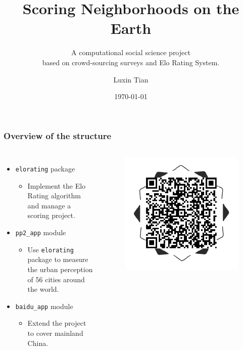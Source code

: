 \documentclass{beamer}
\title{Scoring Neighborhoods on the Earth}
\subtitle{A computational social science project \\based on crowd-sourcing surveys and Elo Rating System.}
\author{Luxin Tian}
\institute{The University of Chicago}
\date{\today}
\begin{document}
\maketitle

\begin{frame}
\frametitle{Overview of the structure}

\begin{columns}
        \begin{itemize}
        \item \texttt{elorating} package
            \begin{itemize}
                \item Implement the Elo Rating algorithm and manage a scoring project. 
            \end{itemize}
        \item \texttt{pp2_app} module
            \begin{itemize}
                \item Use \texttt{elorating} package to measure the urban perception of 56 cities around the world. 
            \end{itemize}
        \item \texttt{baidu_app} module 
            \begin{itemize}
                \item Extend the project to cover mainland China. 
            \end{itemize}
        \end{itemize}

        \begin{figure}
            \includegraphics[scale=0.4]{QR.png}
            \centering
        \end{figure}
\end{columns}

\end{frame}
\end{document}
